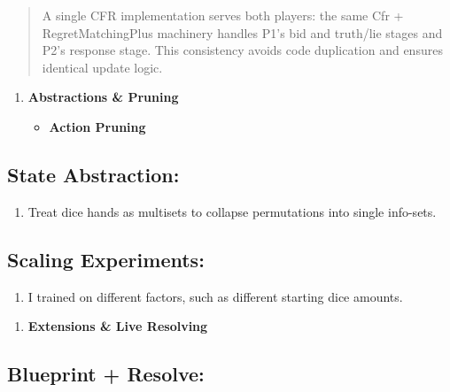 \documentclass[
]{article}
\begin{document}
\begin{quote}
A single CFR implementation serves both players: the same Cfr +
RegretMatchingPlus machinery handles P1's bid and truth/lie stages and
P2's response stage. This consistency avoids code duplication and
ensures identical update logic.
\end{quote}

\begin{enumerate}
\def\labelenumi{\arabic{enumi}.}
\setcounter{enumi}{4}
\item
  \textbf{Abstractions \& Pruning}

  \begin{itemize}
  \item
    \textbf{Action Pruning}
  \end{itemize}
\end{enumerate}

\subsection{\texorpdfstring{\textbf{State Abstraction}:
}{State Abstraction: }}\label{state-abstraction}

\begin{enumerate}
\def\labelenumi{\arabic{enumi}.}
\item
  Treat dice hands as multisets to collapse permutations into single
  info-sets.
\end{enumerate}

\subsection{\texorpdfstring{\textbf{Scaling Experiments}:
}{Scaling Experiments: }}\label{scaling-experiments}

\begin{enumerate}
\def\labelenumi{\arabic{enumi}.}
\setcounter{enumi}{1}
\item
  I trained on different factors, such as different starting dice
  amounts.
\end{enumerate}

\begin{enumerate}
\def\labelenumi{\arabic{enumi}.}
\setcounter{enumi}{5}
\item
  \textbf{Extensions \& Live Resolving}
\end{enumerate}

\subsection{\texorpdfstring{\textbf{Blueprint + Resolve}:
}{Blueprint + Resolve: }}\label{blueprint-resolve}
\end{document}
